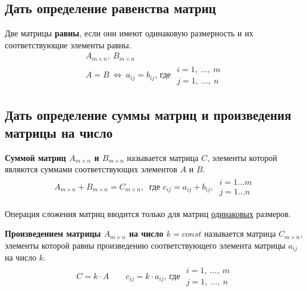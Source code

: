 \subsection{Дать определение равенства матриц}
\begin{definition*}
	Две матрицы \textbf{равны}, если они имеют одинаковую размерность и их соответствующие элементы равны.
	\begin{gather*}
		A_{m\times n},\ B_{m\times n} \\
		A = B\ \iff\ a_{ij} = b_{ij} \text{, где } \begin{array}{l} i=1,\ \ldots ,\ m \\ j=1,\ \ldots ,\ n \end{array}
	\end{gather*}
\end{definition*}

\newpage
\subsection{Дать определение суммы матриц и произведения матрицы на число}
\begin{definition*}
	\textbf{Суммой матриц $A_{m\times n}$ и $B_{m\times n}$} называется матрица $C$, элементы которой являются суммами соответствующих элементов $A$ и $B$.
	\begin{gather*}
		A_{m\times n} + B_{m\times n} = C_{m\times n},\ \text{ где } c_{ij} = a_{ij} + b_{ij},\ \begin{array}{l} i=1\ldots m \\ j=1\ldots n \end{array}
	\end{gather*}
\end{definition*}
\begin{remark}
	Операция сложения матриц вводится только для матриц \underline{одинаковых} размеров.
\end{remark}
\begin{definition*}
	\textbf{Произведением матрицы $A_{m\times n}$ на число $k = const$} называется матрица $C_{m\times n}$, элементы которой равны произведению соответствующего элемента матрицы $a_{ij}$ на число $k$.
	\begin{gather*}
		C = k\cdot A \qquad c_{ij} = k\cdot a_{ij} \text{, где } \begin{array}{l} i=1,\ \ldots ,\ m \\ j=1,\ \ldots ,\ n \end{array}
	\end{gather*}
\end{definition*}

